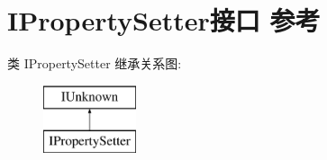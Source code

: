 \hypertarget{interface_i_property_setter}{}\section{I\+Property\+Setter接口 参考}
\label{interface_i_property_setter}
类 I\+Property\+Setter 继承关系图\+:\begin{figure}[H]
\begin{center}
\leavevmode
\includegraphics[height=2.000000cm]{interface_i_property_setter}
\end{center}
\end{figure}

